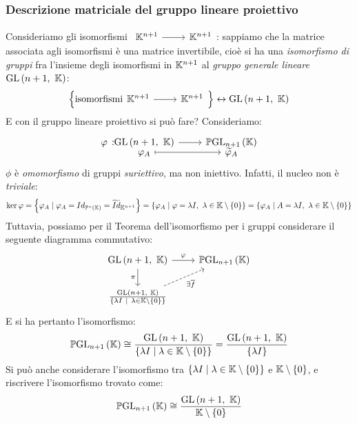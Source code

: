 \subsubsection{Descrizione matriciale del gruppo lineare proiettivo}
Consideriamo gli isomorfismi $\funz{\ }{\kamp^{n+1}}{\kamp^{n+1}}$: sappiamo che la matrice associata agli isomorfismi è una matrice invertibile, cioè si ha una \textit{isomorfismo di gruppi} fra l'insieme degli isomorfismi in $\mathbb{K}^{n+1}$ al \textit{gruppo generale lineare} $\gl\left(n+1,\ \kamp\right)$:
\begin{equation*}
	\left\{\text{isomorfismi}\funz{\ }{\kamp^{n+1}}{\kamp^{n+1}}\right\}\leftrightarrow\gl\left(n+1,\ \kamp\right)
\end{equation*}
E con il gruppo lineare proiettivo si può fare? Consideriamo:
\begin{equation}
	\funztot{\varphi}{\gl\left(n+1,\ \kamp\right)}{\projgl[n+1]{\kamp}}{\phi_A}{\widetilde{\phi}_A}
\end{equation}
 $\phi$ è \textit{omomorfismo} di gruppi \textit{suriettivo}, ma non iniettivo. Infatti, il nucleo non è \textit{triviale}:
 \begin{equation*}
 	\ker \varphi=\left\{\phi_A\mid \phi_A=Id_{\proj[n]{\kamp}}=\widetilde{Id}_{\kamp^{n+1}}\right\}=\left\{\phi_A\mid \phi=\lambda I,\ \lambda\in\kamp\setminus\left\{0\right\}\right\}=\left\{\phi_A\mid A=\lambda I,\ \lambda\in\kamp\setminus\left\{0\right\}\right\}
 \end{equation*}
Tuttavia, possiamo per il Teorema dell'isomorfismo per i gruppi considerare il seguente diagramma commutativo:
\[\begin{tikzcd}
	{\gl\left(n+1,\ \kamp\right)} & {\projgl[n+1]{\kamp}} \\
	{\frac{\gl\left(n+1,\ \kamp\right)}{\left\{\lambda I\ \mid\ \lambda\in\kamp\setminus\left\{0\right\}\right\}}}
	\arrow["{\pi}"', from=1-1, to=2-1]
	\arrow["{\exists \overline f}"', from=2-1, to=1-2, dashed]
	\arrow["{\varphi}", from=1-1, to=1-2]
\end{tikzcd}\]
E si ha pertanto l'isomorfismo:
\begin{equation*}
	\projgl[n+1]{\kamp}\cong \frac{\gl\left(n+1,\ \kamp\right)}{\left\{\lambda I\mid\lambda\in\kamp\setminus\left\{0\right\}\right\}}=\frac{\gl\left(n+1,\ \kamp\right)}{\left\{\lambda I\right\}}
\end{equation*}
Si può anche considerare l'isomorfismo tra $\left\{\lambda I\mid\lambda\in\mathbb{K}\setminus\left\{0\right\}\right\}$ e $\mathbb{K}\setminus\left\{0\right\}$, e riscrivere l'isomorfismo trovato come:
\begin{equation*}
	\projgl[n+1]{\kamp}\cong \frac{\gl\left(n+1,\ \kamp\right)}{\kamp\setminus\left\{0\right\}}
\end{equation*}

